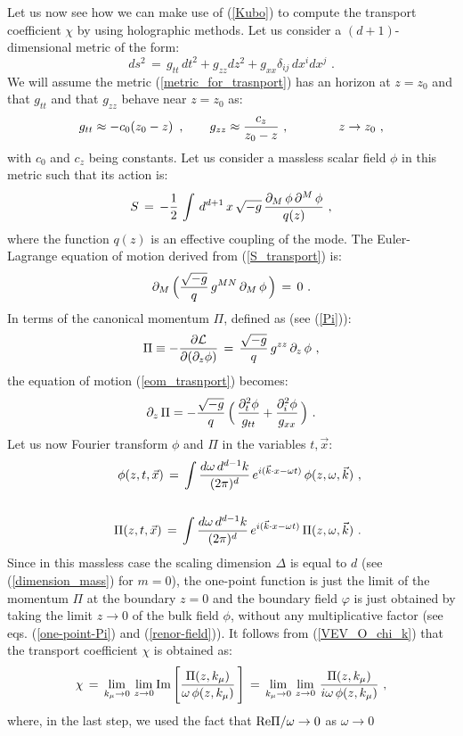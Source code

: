 \documentclass[12pt,notitlepage]{article}
\newcommand{\beq}{\begin{equation}}
\newcommand{\eeq}{\end{equation}}
\newcommand{\rc}{\nonumber\\}
\newcommand{\bear}{\begin{eqnarray}}
\newcommand{\eear}{\end{eqnarray}}
\begin{document}
Let us now see how we can make use of (\ref{Kubo}) to compute the transport coefficient $\chi$ by using holographic methods.  Let us consider a $(d+1)$-dimensional metric of the form:
\beq
ds^2\,=\,g_{tt}\,dt^2+g_{zz} dz^2+g_{xx} \delta_{ij}\,dx^i dx^j\,\,.
\label{metric_for_trasnport}
\eeq
We will  assume the metric (\ref{metric_for_trasnport})  has an horizon at $z=z_0$ and that  $g_{tt}$ and that $g_{zz}$ behave near $z=z_0$ as:
\beq
g_{tt}\approx -c_0 (z_0-z)
\,\,\,,
\qquad
g_{zz}\approx {c_z \over z_0-z}\,\,,
\qquad\qquad
z\to z_0\,\,,
\eeq
with $c_0$ and $c_z$ being constants. Let us consider a massless scalar field $\phi$ in this metric such that its action is:
\beq
S\,=\,-{1\over 2}\,\int\,d^{d+1}\,x\,\sqrt{-g}\,{\partial_M\,\phi\,\partial^M\,\phi\over q(z)}\,\,,
\label{S_transport}
\eeq
where the function $q(z)$ is an effective coupling of the mode. The Euler-Lagrange equation of motion  derived from (\ref{S_transport}) is:
\beq
\partial_{M}\,\Big({\sqrt{-g}\over q}\,g^{MN}\,\partial_M\,\phi\,\Big)\,=\,0\,\,.
\label{eom_trasnport}
\eeq
In terms of the canonical  momentum $\Pi$, defined as (see (\ref{Pi})):
\beq
\Pi\equiv- {\partial {\cal L}\over \partial(\partial_z \phi)}\,=\,
{\sqrt{-g}\over q}\,g^{zz}\,\partial_z\,\phi\,\,,
\label{Pi_transport}
\eeq
the equation of motion  (\ref{eom_trasnport}) becomes:
\beq
\partial_z\,\Pi=-{\sqrt{-g}\over q}\,\Big(\,
{\partial_t^{2}\phi\over g_{tt}}+{\partial_i^{2}\phi\over g_{xx}}
\,\Big)\,\,.
\eeq
Let us now Fourier transform $\phi$ and $\Pi$  in the variables $t, \vec x$:
\bear
&&\phi(z,t,\vec x)\,=\,\int {d\omega\, d^{d-1} k\over (2\pi)^d}\,
e^{i(\vec k\cdot x-\omega t)}\, \phi (z,\omega, \vec k)\,\,,
\rc\rc
&&\Pi(z,t,\vec x)\,=\,\int {d\omega\, d^{d-1} k\over (2\pi)^d}\,
e^{i(\vec k\cdot x-\omega t)}\, \Pi (z,\omega, \vec k)\,\,.
\eear
Since in this massless case the scaling dimension $\Delta$ is equal to $d$ (see (\ref{dimension_mass}) for $m=0$), the one-point function is just the limit of the momentum $\Pi$ at the boundary $z=0$ and the boundary field $\varphi$  is just obtained by taking the limit $z\to 0$ of the bulk field $\phi$, without any multiplicative factor (see  eqs. (\ref{one-point-Pi}) and (\ref{renor-field})). It follows from (\ref{VEV_O_chi_k}) that the transport coefficient $\chi$ is obtained as:
\beq
\chi\,=\,\lim_{k_{\mu}\to 0}\,\lim_{z\to 0} {\rm Im}\,
\Bigg[{\Pi(z,k_{\mu})\over \omega\, \phi(z,k_{\mu})}\,\Bigg]\,=\,
\lim_{k_{\mu}\to 0}\,\lim_{z\to 0} \,
{\Pi(z,k_{\mu})\over i \omega\, \phi(z,k_{\mu})}\,\,,
\eeq
where, in the last step, we used the fact that ${\rm Re}\Pi/\omega\to 0$ as $\omega\to 0$
\end{document}
